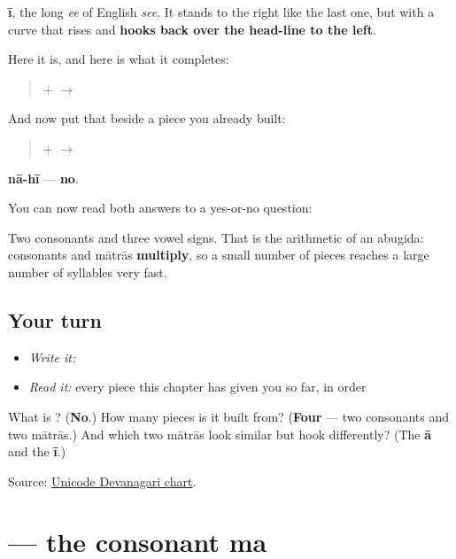 \textbf{ī}, the long \emph{ee} of English \emph{see}. It stands to the right like the last one, but with a curve that rises and \textbf{hooks back over the head-line to the left}.

Here it is, and here is what it completes:

\begin{quote}
\textbf{} + \textbf{} $\to$ \textbf{}
\end{quote}

And now put that beside a piece you already built:

\begin{quote}
\textbf{} + \textbf{} $\to$ \textbf{}
\end{quote}

\textbf{nā-hī} — \textbf{no}.

You can now read both answers to a yes-or-no question:

\begin{quote}
\textbf{}   \textbf{}
\end{quote}

Two consonants and three vowel signs. That is the arithmetic of an abugida: consonants and mātrās \textbf{multiply}, so a small number of pieces reaches a large number of syllables very fast.

\subsection*{Your turn}
\begin{itemize}
\raggedright
  \item \emph{Write it:} 
  \item \emph{Read it:} every piece this chapter has given you so far, in order
\end{itemize}

\begin{tcolorbox}[breakable,colback=teal!4,colframe=teal!35!black,title={Before you move on}]
What is \textbf{}? (\textbf{No}.) How many pieces is it built from? (\textbf{Four} — two consonants and two mātrās.) And which two mātrās look similar but hook differently? (The \textbf{ā} and the \textbf{ī}.)

Source: \href{https://www.unicode.org/charts/PDF/U0900.pdf}{Unicode Devanagari chart}.
\end{tcolorbox}
\section[\texorpdfstring{\mr{म} (ma)}{म (ma)}]{ — the consonant ma}

